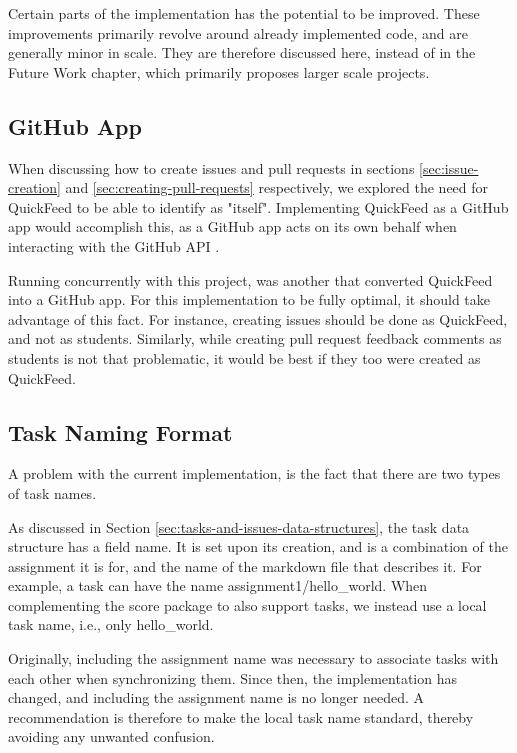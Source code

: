 Certain parts of the implementation has the potential to be improved.
These improvements primarily revolve around already implemented code, and are generally minor in scale.
They are therefore discussed here, instead of in the Future Work chapter, which primarily proposes larger scale projects.

\subsection{GitHub App}
\label{section:github-app}

When discussing how to create issues and pull requests in sections \ref{sec:issue-creation} and \ref{sec:creating-pull-requests} respectively, we explored the need for QuickFeed to be able to identify as "itself".
Implementing QuickFeed as a GitHub app would accomplish this, as a GitHub app acts on its own behalf when interacting with the GitHub API \cite{apps}.

Running concurrently with this project, was another that converted QuickFeed into a GitHub app.
For this implementation to be fully optimal, it should take advantage of this fact.
For instance, creating issues should be done as QuickFeed, and not as students.
Similarly, while creating pull request feedback comments as students is not that problematic, it would be best if they too were created as QuickFeed.

\subsection{Task Naming Format}

A problem with the current implementation, is the fact that there are two types of task names.

As discussed in Section \ref{sec:tasks-and-issues-data-structures}, the task data structure has a field name.
It is set upon its creation, and is a combination of the assignment it is for, and the name of the markdown file that describes it.
For example, a task can have the name assignment1/hello\_world.
When complementing the score package to also support tasks, we instead use a local task name, i.e., only hello\_world.

Originally, including the assignment name was necessary to associate tasks with each other when synchronizing them.
Since then, the implementation has changed, and including the assignment name is no longer needed.
A recommendation is therefore to make the local task name standard, thereby avoiding any unwanted confusion.

